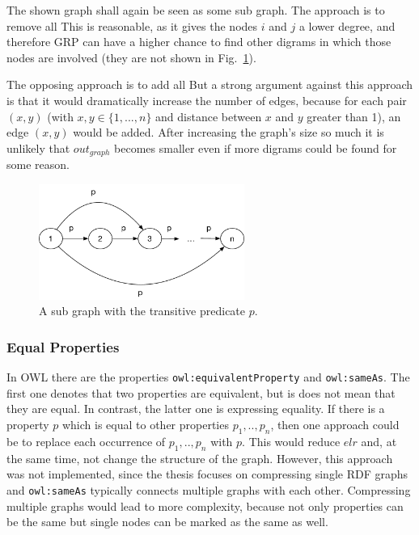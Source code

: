 The shown graph shall again be seen as some sub graph. The approach is to remove all \dtpsp This is reasonable, as it gives the nodes $i$ and $j$ a lower degree, and therefore GRP can have a higher chance to find other digrams in which those nodes are involved (they are not shown in Fig.~\ref{fig:transitiveMat}). 

The opposing approach is to add all \dtpsp But a strong argument against this approach is that it would dramatically increase the number of edges, because for each pair $(x,y)$ (with $x,y\in \{1,...,n\} $  and distance between $x$ and $y$ greater than 1), an edge $(x,y)$ would be added. After increasing the graph's size so much it is unlikely that $out_{graph}$ becomes smaller even if more digrams could be found for some reason. 

\begin{figure}[h]
	\centering
	\includegraphics[width=0.6\textwidth]{figures/approach/transitiveMat}
	\caption{A sub graph with the transitive predicate $p$.}
	\label{fig:transitiveMat}
\end{figure}


\subsubsection{Equal Properties}\label{sec:approachEqualProperties}

In OWL there are the properties {\tt owl:equivalentProperty} and {\tt owl:sameAs}. The first one denotes that two properties are equivalent, but is does not mean that they are equal. In contrast, the latter one is expressing equality. If there is a property $p$ which is equal to other properties $p_1,..,p_n$, then one approach could be to replace each occurrence of $p_1,..,p_n$ with $p$. This would reduce $elr$ and, at the same time, not change the structure of the graph. However, this approach was not implemented, since the thesis focuses on compressing single RDF graphs and {\tt owl:sameAs} typically connects multiple graphs with each other. Compressing multiple graphs would lead to more complexity, because not only properties can be the same but single nodes can be marked as the same as well.


